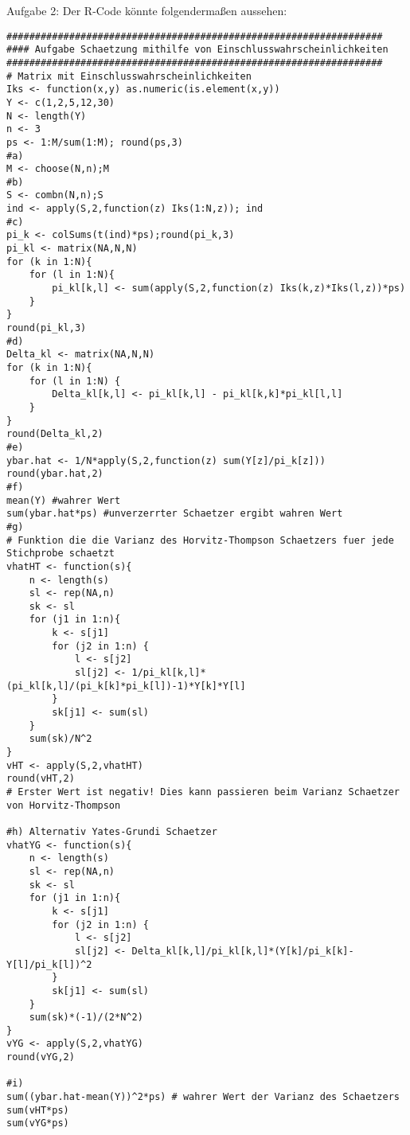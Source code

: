 \begin{Solution}{{Aufgabe 2:}}
Der R-Code könnte folgendermaßen aussehen:
\begin{lstlisting}
##################################################################
#### Aufgabe Schaetzung mithilfe von Einschlusswahrscheinlichkeiten
##################################################################
# Matrix mit Einschlusswahrscheinlichkeiten
Iks <- function(x,y) as.numeric(is.element(x,y))
Y <- c(1,2,5,12,30)
N <- length(Y)
n <- 3
ps <- 1:M/sum(1:M); round(ps,3)
#a)
M <- choose(N,n);M
#b)
S <- combn(N,n);S
ind <- apply(S,2,function(z) Iks(1:N,z)); ind
#c)
pi_k <- colSums(t(ind)*ps);round(pi_k,3)
pi_kl <- matrix(NA,N,N)
for (k in 1:N){
	for (l in 1:N){
		pi_kl[k,l] <- sum(apply(S,2,function(z) Iks(k,z)*Iks(l,z))*ps)
	}
}
round(pi_kl,3)
#d)
Delta_kl <- matrix(NA,N,N)
for (k in 1:N){
	for (l in 1:N) {
		Delta_kl[k,l] <- pi_kl[k,l] - pi_kl[k,k]*pi_kl[l,l]
	}
}
round(Delta_kl,2)
#e)
ybar.hat <- 1/N*apply(S,2,function(z) sum(Y[z]/pi_k[z]))
round(ybar.hat,2)
#f)
mean(Y) #wahrer Wert
sum(ybar.hat*ps) #unverzerrter Schaetzer ergibt wahren Wert
#g)
# Funktion die die Varianz des Horvitz-Thompson Schaetzers fuer jede Stichprobe schaetzt
vhatHT <- function(s){
	n <- length(s)
	sl <- rep(NA,n)
	sk <- sl
	for (j1 in 1:n){
		k <- s[j1]
		for (j2 in 1:n) {
			l <- s[j2]
			sl[j2] <- 1/pi_kl[k,l]*(pi_kl[k,l]/(pi_k[k]*pi_k[l])-1)*Y[k]*Y[l]
		}
		sk[j1] <- sum(sl)
	}
	sum(sk)/N^2
}
vHT <- apply(S,2,vhatHT)
round(vHT,2)
# Erster Wert ist negativ! Dies kann passieren beim Varianz Schaetzer von Horvitz-Thompson

#h) Alternativ Yates-Grundi Schaetzer
vhatYG <- function(s){
	n <- length(s)
	sl <- rep(NA,n)
	sk <- sl
	for (j1 in 1:n){
		k <- s[j1]
		for (j2 in 1:n) {
			l <- s[j2]
			sl[j2] <- Delta_kl[k,l]/pi_kl[k,l]*(Y[k]/pi_k[k]-Y[l]/pi_k[l])^2
		}
		sk[j1] <- sum(sl)
	}
	sum(sk)*(-1)/(2*N^2)
}
vYG <- apply(S,2,vhatYG)
round(vYG,2)

#i)
sum((ybar.hat-mean(Y))^2*ps) # wahrer Wert der Varianz des Schaetzers
sum(vHT*ps)
sum(vYG*ps)
\end{lstlisting}
\end{Solution}
